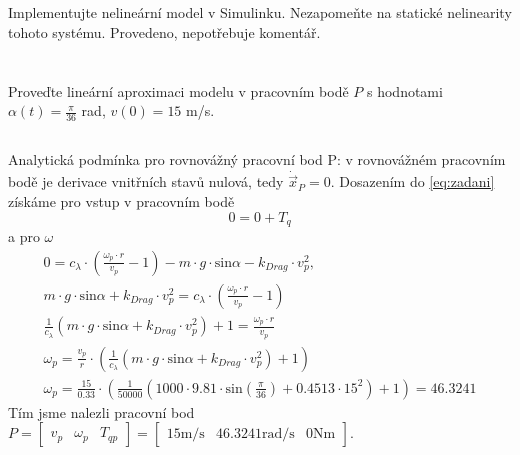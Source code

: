 \documentclass[twoside]{article}
\begin{document}
\section{}
\label{sec:ukol1}
Implementujte nelineární model v Simulinku. Nezapomeňte na statické nelinearity tohoto systému.
Provedeno, nepotřebuje komentář.

\section{}
\label{sec:ukol2}
Proveďte lineární aproximaci modelu v pracovním bodě $P$ s hodnotami $\alpha(t) = \frac{\pi}{36}$ rad, $v(0) = 15$ m/s.

\subsection{}
Analytická podmínka pro rovnovážný pracovní bod P: v rovnovážném pracovním bodě je derivace vnitřních stavů nulová, tedy $\dot{\vec{x}}_P = 0$.
Dosazením do \eqref{eq:zadani} získáme pro vstup v pracovním bodě
\begin{equation}
	0 = 0 + T_q
\end{equation}
a pro $\omega$
\begin{equation}
	\begin{split}
		0 = c_\lambda \cdot \left(\frac{\omega_p \cdot r}{v_p} - 1 \right) - m \cdot g \cdot \text{sin} \alpha - k_{Drag} \cdot v_p^2, \\
		m \cdot g \cdot \text{sin} \alpha + k_{Drag} \cdot v_p^2 =  c_\lambda \cdot \left(\frac{\omega_p \cdot r}{v_p} - 1 \right) \\
		\frac{1}{c_\lambda}(m \cdot g \cdot \text{sin} \alpha + k_{Drag} \cdot v_p^2) + 1 =  \frac{\omega_p \cdot r}{v_p} \\
		\omega_p = \frac{v_p}{r} \cdot(\frac{1}{c_\lambda}(m \cdot g \cdot \text{sin} \alpha + k_{Drag} \cdot v_p^2) + 1)\\
		\omega_p = \frac{15}{0.33} \cdot\left(\frac{1}{50000}\left(1000 \cdot 9.81 \cdot \text{sin}(\frac{\pi}{36}) + 0.4513 \cdot 15^2\right) + 1\right) = 46.3241
	\end{split}
\end{equation}
Tím jsme nalezli pracovní bod $P = \begin{bmatrix}
	v_p & \omega_p & T_{qp}
\end{bmatrix} = \begin{bmatrix}
	15 \text{m/s} & 46.3241 \text{rad/s} & 0 \text{Nm}
\end{bmatrix} $.
\end{document}
